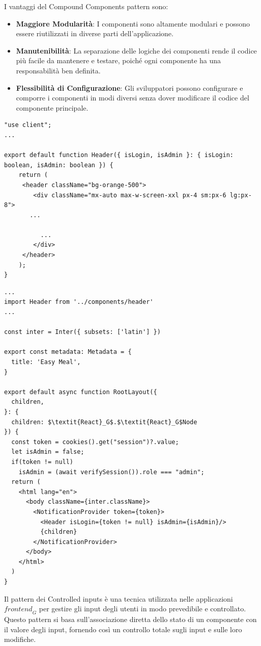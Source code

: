I vantaggi del Compound Components pattern sono:
\begin{itemize}
    \item \textbf{Maggiore Modularità}: I componenti sono altamente modulari e possono essere riutilizzati in diverse parti dell'applicazione.
    \item \textbf{Manutenibilità}: La separazione delle logiche dei componenti rende il codice più facile da mantenere e testare, poiché ogni componente ha una responsabilità ben definita.
    \item \textbf{Flessibilità di Configurazione}: Gli sviluppatori possono configurare e comporre i componenti in modi diversi senza dover modificare il codice del componente principale.
\end{itemize}
\begin{lstlisting}[style=ES6, caption={Esempio di Compound Component}]
"use client";
...

export default function Header({ isLogin, isAdmin }: { isLogin: boolean, isAdmin: boolean }) {
	return (
	 <header className="bg-orange-500">
		<div className="mx-auto max-w-screen-xxl px-4 sm:px-6 lg:px-8">
	   ...
    
          ...
		</div>
	 </header>
	);
}
\end{lstlisting}
\begin{lstlisting}[style=ES6, caption={Esempio dell'uso del component}]
...
import Header from '../components/header'
...

const inter = Inter({ subsets: ['latin'] })

export const metadata: Metadata = {
  title: 'Easy Meal',
}

export default async function RootLayout({
  children,
}: {
  children: $\textit{React}_G$.$\textit{React}_G$Node
}) {
  const token = cookies().get("session")?.value;
  let isAdmin = false;
  if(token != null) 
    isAdmin = (await verifySession()).role === "admin";
  return (
    <html lang="en">
      <body className={inter.className}>
        <NotificationProvider token={token}>
          <Header isLogin={token != null} isAdmin={isAdmin}/>
          {children}
        </NotificationProvider>
      </body>
    </html>
  )
}
\end{lstlisting}
Il pattern dei Controlled inputs è una tecnica utilizzata nelle applicazioni $\textit{frontend}_G$ per gestire gli input degli utenti in modo prevedibile e controllato. Questo pattern si basa sull'associazione diretta dello stato di un componente con il valore degli input, fornendo così un controllo totale sugli input e sulle loro modifiche.
